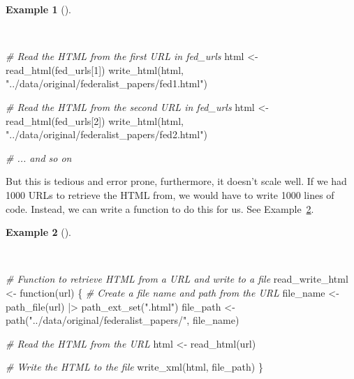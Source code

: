 \documentclass[
  letterpaper,
  DIV=11,
  numbers=noendperiod]{scrreport}
\newenvironment{Shaded}{\begin{snugshade}}{\end{snugshade}}
\newcommand{\CommentTok}[1]{\textcolor[rgb]{0.00,0.00,0.00}{\textit{#1}}}
\newcommand{\ControlFlowTok}[1]{\textcolor[rgb]{0.00,0.00,0.00}{#1}}
\newcommand{\DecValTok}[1]{\textcolor[rgb]{0.00,0.00,0.00}{#1}}
\newcommand{\FunctionTok}[1]{\textcolor[rgb]{0.00,0.00,0.00}{#1}}
\newcommand{\NormalTok}[1]{\textcolor[rgb]{0.00,0.00,0.00}{#1}}
\newcommand{\OtherTok}[1]{\textcolor[rgb]{0.00,0.00,0.00}{#1}}
\newcommand{\SpecialCharTok}[1]{\textcolor[rgb]{0.00,0.00,0.00}{#1}}
\newcommand{\StringTok}[1]{\textcolor[rgb]{0.00,0.00,0.00}{#1}}
\theoremstyle{definition}
\newtheorem{example}{Example}[chapter]
\theoremstyle{remark}
\begin{document}
\begin{example}[]\protect\hypertarget{exm-ad-fed-papers-read-write-html-manual}{}\label{exm-ad-fed-papers-read-write-html-manual}

~

\begin{Shaded}
\begin{Highlighting}[]
\CommentTok{\# Read the HTML from the first URL in \textasciigrave{}fed\_urls\textasciigrave{}}
\NormalTok{html }\OtherTok{\textless{}{-}} \FunctionTok{read\_html}\NormalTok{(fed\_urls[}\DecValTok{1}\NormalTok{])}
\FunctionTok{write\_html}\NormalTok{(html, }\StringTok{"../data/original/federalist\_papers/fed1.html"}\NormalTok{)}

\CommentTok{\# Read the HTML from the second URL in \textasciigrave{}fed\_urls\textasciigrave{}}
\NormalTok{html }\OtherTok{\textless{}{-}} \FunctionTok{read\_html}\NormalTok{(fed\_urls[}\DecValTok{2}\NormalTok{])}
\FunctionTok{write\_html}\NormalTok{(html, }\StringTok{"../data/original/federalist\_papers/fed2.html"}\NormalTok{)}

\CommentTok{\# ... and so on}
\end{Highlighting}
\end{Shaded}

\end{example}

But this is tedious and error prone, furthermore, it doesn't scale well.
If we had 1000 URLs to retrieve the HTML from, we would have to write
1000 lines of code. Instead, we can write a function to do this for us.
See Example~\ref{exm-ad-fed-papers-read-write-function}.

\begin{example}[]\protect\hypertarget{exm-ad-fed-papers-read-write-function}{}\label{exm-ad-fed-papers-read-write-function}

~

\begin{Shaded}
\begin{Highlighting}[]
\CommentTok{\# Function to retrieve HTML from a URL and write to a file}
\NormalTok{read\_write\_html }\OtherTok{\textless{}{-}} \ControlFlowTok{function}\NormalTok{(url) \{}
  \CommentTok{\# Create a file name and path from the URL}
\NormalTok{  file\_name }\OtherTok{\textless{}{-}} \FunctionTok{path\_file}\NormalTok{(url) }\SpecialCharTok{|\textgreater{}} \FunctionTok{path\_ext\_set}\NormalTok{(}\StringTok{".html"}\NormalTok{)}
\NormalTok{  file\_path }\OtherTok{\textless{}{-}} \FunctionTok{path}\NormalTok{(}\StringTok{"../data/original/federalist\_papers/"}\NormalTok{, file\_name)}

  \CommentTok{\# Read the HTML from the URL}
\NormalTok{  html }\OtherTok{\textless{}{-}} \FunctionTok{read\_html}\NormalTok{(url)}

  \CommentTok{\# Write the HTML to the file}
  \FunctionTok{write\_xml}\NormalTok{(html, file\_path)}
\NormalTok{\}}
\end{Highlighting}
\end{Shaded}

\end{example}
\end{document}
